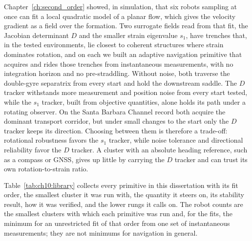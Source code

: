 Chapter~\ref{ch:second_order} showed, in simulation, that six robots sampling at once can fit a local
quadratic model of a planar flow, which gives the velocity gradient as a
field over the formation. Two surrogate fields read from that fit, the
Jacobian determinant $D$ and the smaller strain eigenvalue $s_1$, have
trenches that, in the tested environments, lie closest to coherent
structures where strain dominates rotation, and on each we built an adaptive navigation primitive that acquires
and rides those trenches from instantaneous measurements, with no
integration horizon and no pre-straddling. Without noise, both traverse
the double-gyre separatrix from every start and hold the downstream
saddle. The $D$ tracker withstands more measurement and position noise
from every start tested, while the $s_1$ tracker, built from objective
quantities, alone holds its path under a rotating observer. On the Santa
Barbara Channel record both acquire the dominant transport corridor, but
under small changes to the start only the $D$ tracker keeps its
direction. Choosing between them is therefore a trade-off: rotational
robustness favors the $s_1$ tracker, while noise tolerance and directional
reliability favor the $D$ tracker. A cluster with an absolute heading
reference, such as a compass or GNSS, gives up little by carrying the $D$
tracker and can trust its own rotation-to-strain ratio.

Table~\ref{tab:ch10:library} collects every primitive in this
dissertation with its fit order, the smallest cluster it was run with,
the quantity it steers on, its stability result, how it was verified, and
the lower rungs it calls on. The robot counts are the smallest clusters
with which each primitive was run and, for the fits, the minimum for an
unrestricted fit of that order from one set of instantaneous measurements;
they are not minimums for navigation in general.

